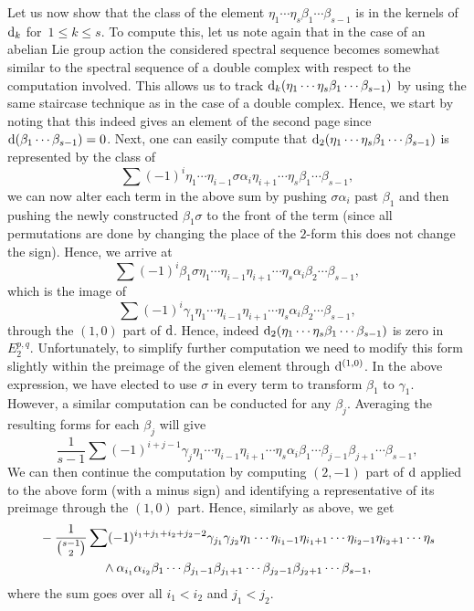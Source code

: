 \documentclass[10pt,a4paper]{amsart}
\numberwithin{equation}{section}
\theoremstyle{definition}
\begin{document}
Let us now show that the class of the element $\eta_1\cdots \eta_s\beta_1\cdots \beta_{s-1}$ is in the kernels of ${\rm d}_{k}$ for~${1\leq k\leq s}$. To compute this, let us note again that in the case of an abelian Lie group action the considered spectral sequence becomes somewhat similar to the spectral sequence of a double complex with respect to the computation involved. This allows us to track ${\rm d}_k(\eta_1\cdots \eta_s\beta_1\cdots \beta_{s-1})$ by using the same staircase technique as in the case of a double complex. Hence, we start by noting that this indeed gives an element of the second page since ${\rm d}(\beta_1\cdots \beta_{s-1})=0$. Next, one can easily compute that ${\rm d}_2(\eta_1\cdots \eta_s\beta_1\cdots \beta_{s-1})$ is represented by the class of
\[\sum (-1)^i\eta_1\cdots \eta_{i-1}\sigma\alpha_i\eta_{i+1}\cdots \eta_s\beta_1\cdots \beta_{s-1},\]
we can now alter each term in the above sum by pushing $\sigma\alpha_i$ past $\beta_1$ and then pushing the newly constructed $\beta_1\sigma$ to the front of the term (since all permutations are done by changing the place of the $2$-form this does not change the sign). Hence, we arrive at
\[\sum (-1)^i\beta_1\sigma\eta_1\cdots \eta_{i-1}\eta_{i+1}\cdots \eta_s\alpha_i\beta_2\cdots \beta_{s-1},\]
which is the image of
\[\sum (-1)^i\gamma_1\eta_1\cdots \eta_{i-1}\eta_{i+1}\cdots \eta_s\alpha_i\beta_2\cdots \beta_{s-1},\]
through the $(1,0)$ part of ${\rm d}$. Hence, indeed ${\rm d}_2(\eta_1\cdots \eta_s\beta_1\cdots \beta_{s-1})$ is zero in $E^{p,q}_2$. Unfortunately, to simplify further computation we need to modify this form slightly within the preimage of the given element through ${\rm d}^{(1,0)}$. In the above expression, we have elected to use $\sigma$ in every term to transform $\beta_1$ to $\gamma_1$. However, a similar computation can be conducted for any $\beta_j$. Averaging the resulting forms for each $\beta_j$ will give
\[\frac{1}{s-1}\sum (-1)^{i+j-1}\gamma_j\eta_1\cdots \eta_{i-1}\eta_{i+1}\cdots \eta_s\alpha_i\beta_1\cdots \beta_{j-1}\beta_{j+1}\cdots \beta_{s-1},\]
We can then continue the computation by computing $(2,-1)$ part of ${\rm d}$ applied to the above form (with a minus sign) and identifying a representative of its preimage through the $(1,0)$ part. Hence, similarly as above, we get{\samepage
\begin{gather*}
\begin{split}
& -\frac{1}{{s-1\choose 2}}\sum (-1)^{i_1+j_1+i_2+j_2-2}\gamma_{j_1}\gamma_{j_2}\eta_1\cdots \eta_{i_1-1}\eta_{i_1+1}\cdots \eta_{i_2-1}\eta_{i_2+1}\cdots\eta_s\\
& \hphantom{-\frac{1}{{s-1\choose 2}}\sum }{}\wedge
\alpha_{i_1}\alpha_{i_2}\beta_1\cdots \beta_{j_1-1}\beta_{j_1+1}\cdots \beta_{j_2-1}\beta_{j_2+1}\cdots \beta_{s-1},
\end{split}
\end{gather*}
where the sum goes over all $i_1<i_2$ and $j_1<j_2$.}
\end{document}
